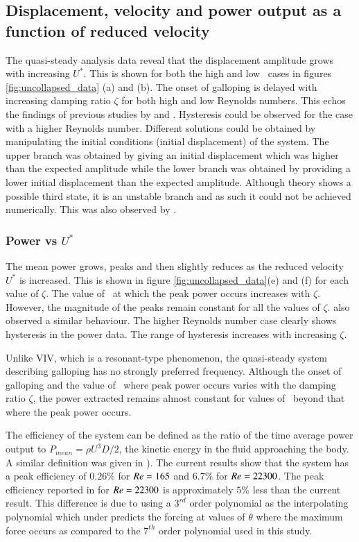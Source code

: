 \subsection{Displacement, velocity and power output as a function of reduced velocity}

 The quasi-steady analysis data reveal that the displacement amplitude grows with increasing $U^*$. This is shown for both the high and low \reynoldsnumber\ cases in figures \ref{fig:uncollapsed_data} (a) and (b). The onset of galloping is delayed with increasing damping ratio $\zeta$ for both high and low Reynolds numbers. This echos the findings of previous studies by \cite{Parkinson1964} and \cite{Barrero-Gil2010a}. Hysteresis could be observed for the case with a higher Reynolds number. Different solutions could be obtained by manipulating the initial conditions (initial displacement) of the system. The upper branch was obtained by giving an initial displacement which was higher than the expected amplitude while the lower branch was obtained by providing a lower initial displacement than the expected amplitude. Although theory shows a possible third state, it is an unstable branch and as such it could not be achieved numerically. This was also observed by \cite{Vio2007}.

\subsubsection*{Power vs $U^*$}
 
 The mean power grows, peaks and then slightly reduces as the reduced velocity $U^*$ is increased. This is shown in figure \ref{fig:uncollapsed_data}(e) and (f) for each value of $\zeta$. The value of  \ustar\ at which the peak power occurs increases with $\zeta$. However, the magnitude of the peaks remain constant for all the values of $\zeta$. \citet{Barrero-Gil2010a} also observed a similar behaviour. The higher Reynolds number case clearly shows hysteresis in the power data. The range of hysteresis increases with increasing $\zeta$.

Unlike VIV, which is a resonant-type phenomenon, the quasi-steady system describing galloping has no strongly preferred frequency. Although the onset of galloping and the value of \ustar\ where peak power occurs varies with the damping ratio $\zeta$, the power extracted remains almost constant for values of \ustar\ beyond that where the peak power occurs. 

The efficiency of the system can be defined as the ratio of the time average power output to $P_{mean}=\rho U^3D/2$, the kinetic energy in the fluid approaching the body. A similar definition was given in \citet{Barrero-Gil2010a}). The current results show that the system has a peak efficiency of $0.26\%$  for $Re=165$ and $6.7\%$ for $Re=22300$. The peak efficiency reported in \citet{Barrero-Gil2010a} for $Re=22300$ is approximately $5\%$ less than the current result. This difference is due to \cite{Barrero-Gil2010a} using a $3^{rd}$ order polynomial as the interpolating polynomial which under predicts the forcing at values of $\theta$ where the maximum force occurs as compared to the $7^{th}$ order polynomial used in this study.   
 
